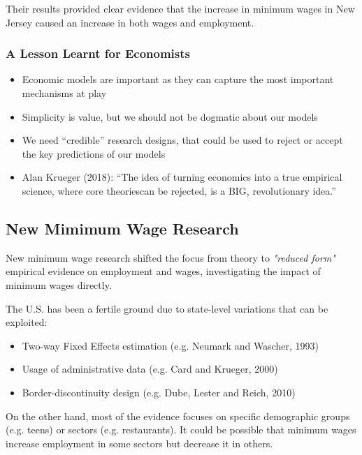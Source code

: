             Their results provided clear evidence that the increase in minimum wages in New Jersey caused an increase in both wages and employment.
            
        \subsubsection{A Lesson Learnt for Economists}
            \begin{itemize}
                \item Economic models are important as they can capture the most important mechanisms at play
                \item Simplicity is value, but we should not be dogmatic about our models
                \item We need “credible” research designs, that could be used to reject or accept the key predictions of our models
                \item Alan Krueger (2018): “The idea of turning economics into a true empirical science, where core theoriescan be rejected, is a BIG, revolutionary idea.”
            \end{itemize}
    
    \subsection{New Mimimum Wage Research}
        New minimum wage research shifted the focus from theory to \emph{"reduced form"} empirical evidence on employment and wages, investigating the impact of minimum wages directly.
        
        The U.S. has been a fertile ground due to state-level variations that can be exploited:
        \begin{itemize}
            \item Two-way Fixed Effects estimation (e.g. Neumark and Wascher, 1993)
            \item Usage of administrative data (e.g. Card and Krueger, 2000)
            \item Border-discontinuity design (e.g. Dube, Lester and Reich, 2010)
        \end{itemize}
        
        On the other hand, most of the evidence focuses on specific demographic groups (e.g. teens) or sectors (e.g. restaurants). It could be possible that minimum wages increase employment in some sectors but decrease it in others.
        

